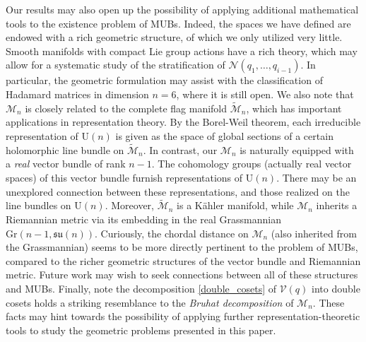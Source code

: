 \documentclass[referee,sn-mathphys-num]{sn-jnl}%
\theoremstyle{thmstyleone}%
\theoremstyle{thmstyletwo}%
\theoremstyle{remark}
\theoremstyle{thmstylethree}%
\begin{document}
Our results may also open up the possibility of applying additional mathematical tools to the existence problem of MUBs. Indeed, the spaces we have defined are endowed with a rich geometric structure, of which we only utilized very little.
Smooth manifolds with compact Lie group actions have a rich theory, which may allow for a systematic study of the stratification of $ \mathcal{N} \left( q_1, \ldots, q_{i-1} \right) $. In particular, the geometric formulation may assist with the classification of Hadamard matrices in dimension $n=6$, where it is still open.
We also note that $ \mathcal{M}_n $ is closely related to the complete flag manifold $ \tilde{\mathcal{M}}_n $, which has important applications in representation theory. By the Borel-Weil theorem, each irreducible representation of $ \mathrm{U} \left( n \right) $ is given as the space of global sections of a certain holomorphic line bundle on $ \tilde{\mathcal{M}}_n $. In contrast, our $ \mathcal{M}_n $ is naturally equipped with a \textit{real} vector bundle of rank $n-1$. The cohomology groups (actually real vector spaces) of this vector bundle furnish representations of $ \mathrm{U} \left( n \right) $. There may be an unexplored connection between these representations, and those realized on the line bundles on $ \mathrm{U} \left( n \right) $.
Moreover, $ \tilde{\mathcal{M}}_n $ is a K\"{a}hler manifold, while $ \mathcal{M}_n $ inherits a Riemannian metric via its embedding in the real Grassmannian $ \mathrm{Gr} \left( n-1, \mathfrak{su} \left( n \right) \right) $. Curiously, the chordal distance on $ \mathcal{M}_n $ (also inherited from the Grassmannian) seems to be more directly pertinent to the problem of MUBs, compared to the richer geometric structures of the vector bundle and Riemannian metric. Future work may wish to seek connections between all of these structures and MUBs.
Finally, note the decomposition \eqref{double_cosets} of $ \mathcal{V} \left( q \right) $ into double cosets holds a striking resemblance to the \textit{Bruhat decomposition} of $ \mathcal{M}_n $.
These facts may hint towards the possibility of applying further representation-theoretic tools to study the geometric problems presented in this paper.

\backmatter

\end{document}
